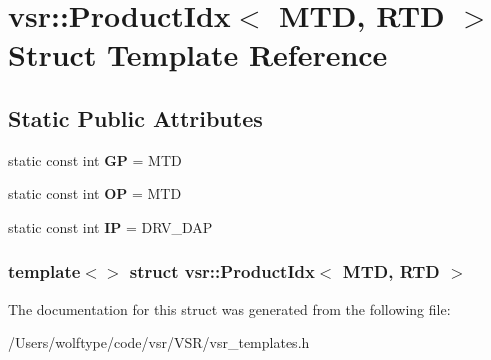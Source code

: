 \hypertarget{structvsr_1_1_product_idx_3_01_m_t_d_00_01_r_t_d_01_4}{\section{vsr\-:\-:Product\-Idx$<$ M\-T\-D, R\-T\-D $>$ Struct Template Reference}
\label{structvsr_1_1_product_idx_3_01_m_t_d_00_01_r_t_d_01_4}
}
\subsection*{Static Public Attributes}
\begin{DoxyCompactItemize}
\item 
\hypertarget{structvsr_1_1_product_idx_3_01_m_t_d_00_01_r_t_d_01_4_a4d40f76e8d7552b94ed5331b540152af}{static const int {\bfseries G\-P} = M\-T\-D}\label{structvsr_1_1_product_idx_3_01_m_t_d_00_01_r_t_d_01_4_a4d40f76e8d7552b94ed5331b540152af}

\item 
\hypertarget{structvsr_1_1_product_idx_3_01_m_t_d_00_01_r_t_d_01_4_a01ed19fa223e85c226982d20288d5b9c}{static const int {\bfseries O\-P} = M\-T\-D}\label{structvsr_1_1_product_idx_3_01_m_t_d_00_01_r_t_d_01_4_a01ed19fa223e85c226982d20288d5b9c}

\item 
\hypertarget{structvsr_1_1_product_idx_3_01_m_t_d_00_01_r_t_d_01_4_a512218a8c8376c1df7cebd211cb3f86e}{static const int {\bfseries I\-P} = D\-R\-V\-\_\-\-D\-A\-P}\label{structvsr_1_1_product_idx_3_01_m_t_d_00_01_r_t_d_01_4_a512218a8c8376c1df7cebd211cb3f86e}

\end{DoxyCompactItemize}
\subsubsection*{template$<$$>$ struct vsr\-::\-Product\-Idx$<$ M\-T\-D, R\-T\-D $>$}



The documentation for this struct was generated from the following file\-:\begin{DoxyCompactItemize}
\item 
/\-Users/wolftype/code/vsr/\-V\-S\-R/vsr\-\_\-templates.\-h\end{DoxyCompactItemize}
